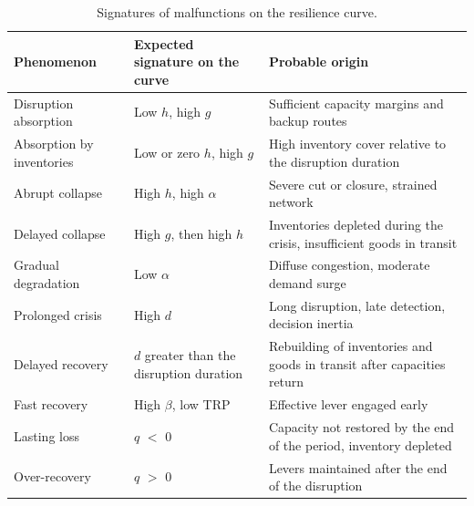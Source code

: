\begin{table}[htbp]
\caption{Signatures of malfunctions on the resilience curve.}
\label{tab:S3}
\footnotesize
\begin{tabularx}{\textwidth}{@{}LLL@{}}
\toprule
\textbf{Phenomenon} & \textbf{Expected signature on the curve} & \textbf{Probable origin} \\
\midrule
Disruption absorption & Low $h$, high $g$ & Sufficient capacity margins and backup routes \\
Absorption by inventories & Low or zero $h$, high $g$ & High inventory cover relative to the disruption duration \\
Abrupt collapse & High $h$, high $\alpha$ & Severe cut or closure, strained network \\
Delayed collapse & High $g$, then high $h$ & Inventories depleted during the crisis, insufficient goods in transit \\
Gradual degradation & Low $\alpha$ & Diffuse congestion, moderate demand surge \\
Prolonged crisis & High $d$ & Long disruption, late detection, decision inertia \\
Delayed recovery & $d$ greater than the disruption duration & Rebuilding of inventories and goods in transit after capacities return \\
Fast recovery & High $\beta$, low TRP & Effective lever engaged early \\
Lasting loss & $q$ $<$ 0 & Capacity not restored by the end of the period, inventory depleted \\
Over-recovery & $q$ $>$ 0 & Levers maintained after the end of the disruption \\
\bottomrule
\end{tabularx}
\end{table}
